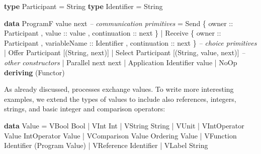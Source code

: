 \documentclass[runningheads,plain]{llncs}
\newenvironment{Shaded}{}{}
\newcommand{\KeywordTok}[1]{\textcolor[rgb]{0.00,0.44,0.13}{\textbf{#1}}}
\newcommand{\DataTypeTok}[1]{\textcolor[rgb]{0.56,0.13,0.00}{#1}}
\newcommand{\CommentTok}[1]{\textcolor[rgb]{0.38,0.63,0.69}{\textit{#1}}}
\newcommand{\OtherTok}[1]{\textcolor[rgb]{0.00,0.44,0.13}{#1}}
\newcommand{\FunctionTok}[1]{\textcolor[rgb]{0.02,0.16,0.49}{#1}}
\newcommand{\NormalTok}[1]{#1}
\begin{document}
\begin{Shaded}
\begin{Highlighting}[]
\KeywordTok{type} \DataTypeTok{Participant} \FunctionTok{=} \DataTypeTok{String}
\KeywordTok{type} \DataTypeTok{Identifier} \FunctionTok{=} \DataTypeTok{String}

\KeywordTok{data} \DataTypeTok{ProgramF}\NormalTok{ value next }
    \CommentTok{-- communication primitives}
    \FunctionTok{=} \DataTypeTok{Send} 
\NormalTok{        \{}\OtherTok{ owner ::} \DataTypeTok{Participant}
\NormalTok{        ,}\OtherTok{ value ::}\NormalTok{ value}
\NormalTok{        ,}\OtherTok{ continuation ::}\NormalTok{ next }
\NormalTok{        \}}
    \FunctionTok{|} \DataTypeTok{Receive} 
\NormalTok{        \{}\OtherTok{ owner ::} \DataTypeTok{Participant}
\NormalTok{        ,}\OtherTok{ variableName ::} \DataTypeTok{Identifier}
\NormalTok{        ,}\OtherTok{ continuation ::}\NormalTok{ next  }
\NormalTok{        \}}
 \CommentTok{-- choice primitives}
    \FunctionTok{|} \DataTypeTok{Offer} \DataTypeTok{Participant}\NormalTok{ [}\NormalTok{(}\DataTypeTok{String}\NormalTok{, next)]}
    \FunctionTok{|} \DataTypeTok{Select} \DataTypeTok{Participant}\NormalTok{ [}\NormalTok{(}\DataTypeTok{String}\NormalTok{, value, next)]}
 \CommentTok{-- other constructors }
    \FunctionTok{|} \DataTypeTok{Parallel}\NormalTok{ next next }
    \FunctionTok{|} \DataTypeTok{Application} \DataTypeTok{Identifier}\NormalTok{ value}
    \FunctionTok{|} \DataTypeTok{NoOp}
    \KeywordTok{deriving}\NormalTok{ (}\DataTypeTok{Functor}\NormalTok{) }
\end{Highlighting}
\end{Shaded}

\noindent
As already discussed, processes exchange values. 
To write more interesting examples,
we extend the types of values 
to   include also references, integers, strings, and basic
integer and comparison operators:
\begin{Shaded}
\begin{Highlighting}[]
\KeywordTok{data} \DataTypeTok{Value} 
    \FunctionTok{=} \DataTypeTok{VBool} \DataTypeTok{Bool}
    \FunctionTok{|} \DataTypeTok{VInt} \DataTypeTok{Int}
    \FunctionTok{|} \DataTypeTok{VString} \DataTypeTok{String}
    \FunctionTok{|} \DataTypeTok{VUnit}
    \FunctionTok{|} \DataTypeTok{VIntOperator} \DataTypeTok{Value} \DataTypeTok{IntOperator} \DataTypeTok{Value} 
    \FunctionTok{|} \DataTypeTok{VComparison} \DataTypeTok{Value} \DataTypeTok{Ordering} \DataTypeTok{Value}
    \FunctionTok{|} \DataTypeTok{VFunction} \DataTypeTok{Identifier}\NormalTok{ (}\DataTypeTok{Program} \DataTypeTok{Value}\NormalTok{)}
    \FunctionTok{|} \DataTypeTok{VReference} \DataTypeTok{Identifier} 
    \FunctionTok{|} \DataTypeTok{VLabel} \DataTypeTok{String}
\end{Highlighting}
\end{Shaded}
\end{document}
